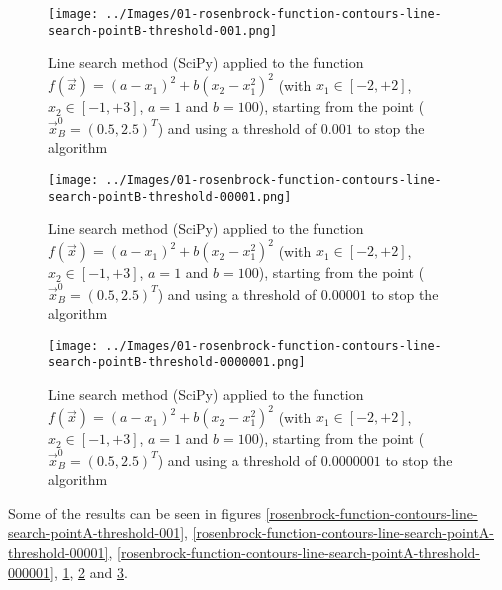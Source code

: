         \begin{figure}
            \centering
            \texttt{[image: ../Images/01-rosenbrock-function-contours-line-search-pointB-threshold-001.png]}
            \caption{Line search method (SciPy) applied to the function \(f(\vec{x}) = (a - x_1)^2 + b(x_2 - x_1^2)^2\) (with \(x_1 \in [-2, +2]\), \(x_2 \in [-1, +3]\), \(a=1\) and \(b=100\)), starting from the point (\(\vec{x}_B^0 = (0.5, 2.5)^T\)) and using a threshold of \(0.001\) to stop the algorithm}
            \label{rosenbrock-function-contours-line-search-pointB-threshold-001}
        \end{figure}
        \begin{figure}
            \centering
            \texttt{[image: ../Images/01-rosenbrock-function-contours-line-search-pointB-threshold-00001.png]}
            \caption{Line search method (SciPy) applied to the function \(f(\vec{x}) = (a - x_1)^2 + b(x_2 - x_1^2)^2\) (with \(x_1 \in [-2, +2]\), \(x_2 \in [-1, +3]\), \(a=1\) and \(b=100\)), starting from the point (\(\vec{x}_B^0 = (0.5, 2.5)^T\)) and using a threshold of \(0.00001\) to stop the algorithm}
            \label{rosenbrock-function-contours-line-search-pointB-threshold-00001}
        \end{figure}
        \begin{figure}
            \centering
            \texttt{[image: ../Images/01-rosenbrock-function-contours-line-search-pointB-threshold-0000001.png]}
            \caption{Line search method (SciPy) applied to the function \(f(\vec{x}) = (a - x_1)^2 + b(x_2 - x_1^2)^2\) (with \(x_1 \in [-2, +2]\), \(x_2 \in [-1, +3]\), \(a=1\) and \(b=100\)), starting from the point (\(\vec{x}_B^0 = (0.5, 2.5)^T\)) and using a threshold of \(0.0000001\) to stop the algorithm}
            \label{rosenbrock-function-contours-line-search-pointB-threshold-000001}
        \end{figure}
        Some of the results can be seen in figures \ref{rosenbrock-function-contours-line-search-pointA-threshold-001}, \ref{rosenbrock-function-contours-line-search-pointA-threshold-00001}, \ref{rosenbrock-function-contours-line-search-pointA-threshold-000001}, \ref{rosenbrock-function-contours-line-search-pointB-threshold-001}, \ref{rosenbrock-function-contours-line-search-pointB-threshold-00001} and \ref{rosenbrock-function-contours-line-search-pointB-threshold-000001}.